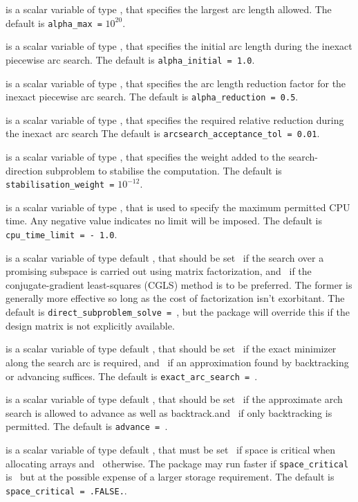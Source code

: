 \documentclass{galahad}
\begin{document}
\begin{description}
 is a scalar variable of type \realdp, that specifies
the largest arc length allowed.
The default is {\tt alpha\_max =} $10^{20}$.

 is a scalar variable of type \realdp, that
specifies the initial arc length during the inexact piecewise arc search.
The default is {\tt alpha\_initial = 1.0}.

 is a scalar variable of type \realdp, that
specifies the arc length reduction factor for the inexact piecewise arc search.
The default is {\tt alpha\_reduction = 0.5}.

 is a scalar variable of type \realdp,
that specifies the required relative reduction during the inexact arc search
The default is {\tt arcsearch\_acceptance\_tol = 0.01}.

 is a scalar variable of type \realdp,
that specifies the weight added to the search-direction subproblem to 
stabilise the computation.
The default is {\tt stabilisation\_weight =} $10^{-12}$.

 is a scalar variable of type \realdp,
that is used to specify the maximum permitted CPU time. Any negative
value indicates no limit will be imposed. The default is
{\tt cpu\_time\_limit = - 1.0}.

 is a scalar variable of type default \logical,
that should be set \true\ if the search over a promising subspace is
carried out using matrix factorization, and \false\ if the conjugate-gradient
least-squares (CGLS) method is to be preferred. The former is generally
more effective so long as the cost of factorization isn't exorbitant.
The default is {\tt direct\_subproblem\_solve = \true}, but the
package will override this if the design matrix is not explicitly available.

 is a scalar variable of type default \logical,
that should be set \true\ if the exact minimizer along the search arc is
required, and \false\ if an approximation found by backtracking or
advancing suffices.
The default is {\tt exact\_arc\_search = \true}.

 is a scalar variable of type default \logical, that should
be set \true\ if the approximate arch search is allowed to advance as
well as backtrack.and \false\ if only backtracking is permitted.
The default is {\tt advance = \true}.

 is a scalar variable of type default \logical,
that must be set \true\ if space is critical when allocating arrays
and  \false\ otherwise. The package may run faster if
{\tt space\_critical} is \false\ but at the possible expense of a larger
storage requirement. The default is {\tt space\_critical = .FALSE.}.


\end{description}
\end{document}
